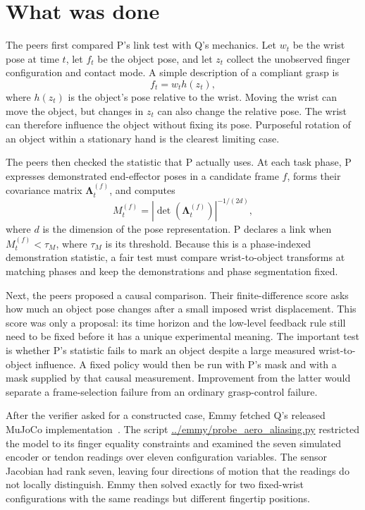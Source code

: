 \documentclass{article}
\begin{document}
\section{What was done}

The peers first compared P's link test with Q's mechanics.  Let \(w_t\) be the wrist pose at time \(t\), let \(f_t\) be the object pose, and let \(z_t\) collect the unobserved finger configuration and contact mode.  A simple description of a compliant grasp is
\[
  f_t = w_t h(z_t),
\]
where \(h(z_t)\) is the object's pose relative to the wrist.  Moving the wrist can move the object, but changes in \(z_t\) can also change the relative pose.  The wrist can therefore influence the object without fixing its pose.  Purposeful rotation of an object within a stationary hand is the clearest limiting case.

The peers then checked the statistic that P actually uses.  At each task phase, P expresses demonstrated end-effector poses in a candidate frame \(f\), forms their covariance matrix \(\boldsymbol{\Lambda}_t^{(f)}\), and computes
\[
  M_t^{(f)}=
  \left|\det\!\left(\boldsymbol{\Lambda}_t^{(f)}\right)\right|^{-1/(2d)},
\]
where \(d\) is the dimension of the pose representation.  P declares a link when \(M_t^{(f)}<\tau_M\), where \(\tau_M\) is its threshold.  Because this is a phase-indexed demonstration statistic, a fair test must compare wrist-to-object transforms at matching phases and keep the demonstrations and phase segmentation fixed.

Next, the peers proposed a causal comparison.  Their finite-difference score asks how much an object pose changes after a small imposed wrist displacement.  This score was only a proposal: its time horizon and the low-level feedback rule still need to be fixed before it has a unique experimental meaning.  The important test is whether P's statistic fails to mark an object despite a large measured wrist-to-object influence.  A fixed policy would then be run with P's mask and with a mask supplied by that causal measurement.  Improvement from the latter would separate a frame-selection failure from an ordinary grasp-control failure.

After the verifier asked for a constructed case, Emmy fetched Q's released MuJoCo implementation~\cite{aerorepo}.  The script \url{../emmy/probe_aero_aliasing.py} restricted the model to its finger equality constraints and examined the seven simulated encoder or tendon readings over eleven configuration variables.  The sensor Jacobian had rank seven, leaving four directions of motion that the readings do not locally distinguish.  Emmy then solved exactly for two fixed-wrist configurations with the same readings but different fingertip positions.
\end{document}
